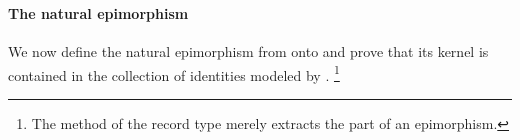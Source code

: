 \begin{code}
\AgdaSymbol{\}}\<%
\\
%
\\[\AgdaEmptyExtraSkip]%
%
\>[1]\AgdaSpace{}%
\AgdaSymbol{:}\AgdaSpace{}%
\AgdaSpace{}%
\AgdaSpace{}%
\AgdaSpace{}%
\AgdaSpace{}%
\AgdaSymbol{(}\AgdaSpace{}%
\AgdaSymbol{)}\AgdaSpace{}%
\AgdaSymbol{\AgdaUnderscore{}}\<%
\\
%
\>[1]\AgdaSpace{}%
\AgdaOperator{\AgdaFunction{𝔽[}}\AgdaSpace{}%
\AgdaSpace{}%
\AgdaOperator{\AgdaFunction{]}}\AgdaSpace{}%
\AgdaSymbol{=}\AgdaSpace{}%
\AgdaSpace{}%
\<%
\\
%
\>[1]\AgdaSpace{}%
\AgdaOperator{\AgdaFunction{𝔽[}}\AgdaSpace{}%
\AgdaSpace{}%
\AgdaOperator{\AgdaFunction{]}}\AgdaSpace{}%
\AgdaSymbol{=}\AgdaSpace{}%
\AgdaSpace{}%
\<%
\\
\>[1][@{}l@{\AgdaIndent{0}}]%
\>[2]\AgdaSpace{}%
\AgdaSymbol{:}\AgdaSpace{}%
\AgdaSpace{}%
\AgdaSymbol{\{}\AgdaSymbol{\}}\AgdaSpace{}%
\AgdaSpace{}%
\AgdaSpace{}%
\AgdaSpace{}%
\AgdaSpace{}%
\AgdaSymbol{(}\AgdaSpace{}%
\AgdaSymbol{)}\AgdaSpace{}%
\AgdaSpace{}%
\AgdaSpace{}%
\<%
\\
%
\>[2]\AgdaSpace{}%
\AgdaSpace{}%
\AgdaSymbol{(}\AgdaSpace{}%
\AgdaOperator{\AgdaInductiveConstructor{,}}\AgdaSpace{}%
\AgdaSymbol{)}%
\>[32]\AgdaSymbol{=}\AgdaSpace{}%
\AgdaSpace{}%
\AgdaSpace{}%
\<%
\\
%
\>[2]\AgdaSpace{}%
\AgdaSpace{}%
\AgdaSymbol{(}\AgdaSpace{}%
\AgdaOperator{\AgdaInductiveConstructor{,}}\AgdaSpace{}%
\AgdaSymbol{)}%
\>[32]\AgdaSymbol{=}\AgdaSpace{}%
\AgdaSpace{}%
\<%
\end{code}

\paragraph*{The natural epimorphism} %
We now define the natural epimorphism from  onto  %
and prove that its kernel is contained in the collection of identities modeled
by  .%
\ifshort%
\footnote{The  method of the  record type merely extracts the  part of an epimorphism.}
\fi

